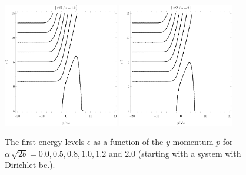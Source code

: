 \begin{figure}[p]
    \\[1em]%
    \includegraphics[width=0.45\textwidth]{grafy/robin1.2.pdf}%
    \hspace{0.1\textwidth}%
    \includegraphics[width=0.45\textwidth]{grafy/robin2.pdf}\par
    \caption{The first energy levels $\epsilon$ as a function of the $y$-momentum $p$ for $\alpha\,\sqrt{2b} = 0.0, 0.5, 0.8, 1.0, 1.2$ and $2.0$ (starting with a system with Dirichlet bc.).}
    \label{plots-robin-positive}
\end{figure}

